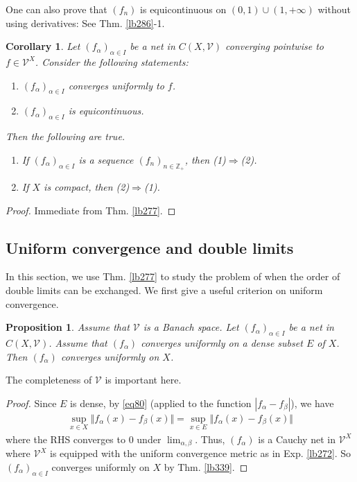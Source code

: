 \documentclass[12pt,b5paper,notitlepage]{article}
\theoremstyle{definition}
\theoremstyle{plain}
\newtheorem{pp}[df]{Proposition}
\newtheorem{co}[df]{Corollary}
\newcommand{\mc}{\mathcal}
\newcommand{\Zbb}{\mathbb Z}
\numberwithin{equation}{section}
\begin{document}
One can also prove that $(f_n)$ is equicontinuous on $(0,1)\cup(1,+\infty)$ without using derivatives: See Thm. \ref{lb286}-1.





\begin{co}\label{lb284}
Let $(f_\alpha)_{\alpha\in I}$ be a net in $C(X,\mc V)$ converging pointwise to $f\in\mc V^X$. Consider the following statements:
\begin{enumerate}[label=(\arabic*)]
\item $(f_\alpha)_{\alpha\in I}$ converges uniformly to $f$.
\item $(f_\alpha)_{\alpha\in I}$ is equicontinuous.
\end{enumerate}
Then the following are true.
\begin{enumerate}
\item If $(f_\alpha)_{\alpha\in I}$ is a sequence $(f_n)_{n\in\Zbb_+}$, then (1)$\Rightarrow$(2).
\item If $X$ is compact, then (2)$\Rightarrow$(1).
\end{enumerate}
\end{co}


\begin{proof}
Immediate from Thm. \ref{lb277}.
\end{proof}









\subsection{Uniform convergence and double limits}



In this section, we use Thm. \ref{lb277} to study the problem of when the order of double limits can be exchanged. We first give a useful criterion on uniform convergence.


\begin{pp}\label{lb288}
Assume that $\mc V$ is a Banach space. Let $(f_\alpha)_{\alpha\in I}$ be a net in $C(X,\mc V)$. Assume that $(f_\alpha)$ converges uniformly on a dense subset $E$ of $X$. Then $(f_\alpha)$ converges uniformly on $X$.
\end{pp}

The completeness of $\mc V$ is important here.

\begin{proof}
Since $E$ is dense, by \eqref{eq80} (applied to the function $|f_\alpha-f_\beta|$), we have
\begin{align*}
\sup_{x\in X}\Vert f_\alpha(x)-f_\beta(x)\Vert=\sup_{x\in E}\Vert f_\alpha(x)-f_\beta(x)\Vert
\end{align*}
where the RHS converges to $0$ under $\lim_{\alpha,\beta}$. Thus, $(f_\alpha)$ is a Cauchy net in $\mc V^X$ where $\mc V^X$ is equipped with the uniform convergence metric as in Exp. \ref{lb272}. So $(f_\alpha)_{\alpha\in I}$ converges uniformly on $X$ by Thm. \ref{lb339}.
\end{proof}
\end{document}
